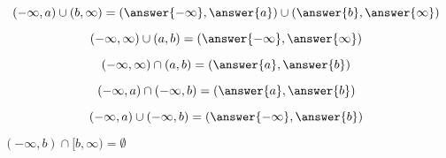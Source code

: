 \documentclass{ximera}
\begin{document}
\begin{exercise}
\[
(-\infty, a) \cup (b, \infty) = \left( \answer{-\infty}, \answer{a} \right) \cup \left( \answer{b}, \answer{\infty} \right)
\]
\end{exercise}








\begin{exercise}
\[
(-\infty, \infty) \cup (a, b) = \left( \answer{-\infty}, \answer{\infty} \right)
\]
\end{exercise}






\begin{exercise}
\[
(-\infty, \infty) \cap (a, b) = \left( \answer{a}, \answer{b} \right)
\]
\end{exercise}





\begin{exercise}
\[
(-\infty, a) \cap (-\infty, b) = \left( \answer{a}, \answer{b} \right)
\]
\end{exercise}




\begin{exercise}
\[
(-\infty, a) \cup (-\infty, b) = \left( \answer{-\infty}, \answer{b} \right)
\]
\end{exercise}



\begin{exercise}

$(-\infty, b) \cap [b, \infty) = \emptyset$

\begin{multipleChoice}
\end{multipleChoice}

\end{exercise}
\end{document}
